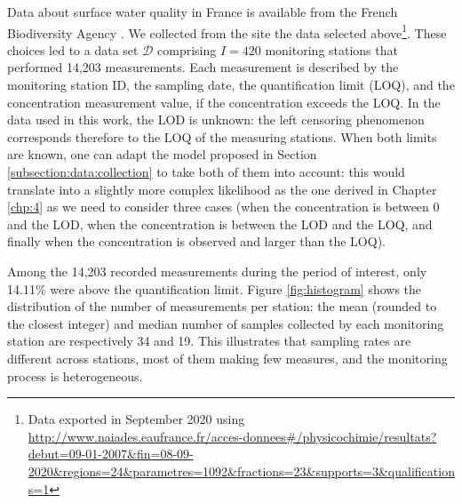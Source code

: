 Data about surface water quality in France is available from the French Biodiversity Agency \cite{Naiade}. We collected from the site the data selected above\footnote{Data exported in September 2020 using \url{http://www.naiades.eaufrance.fr/acces-donnees\#/physicochimie/resultats?debut=09-01-2007&fin=08-09-2020&regions=24&parametres=1092&fractions=23&supports=3&qualifications=1}}. 
These choices led to a data set $\mathcal D$ comprising $I = 420$ monitoring stations that performed 14,203 measurements. Each measurement is described by the monitoring station ID, the sampling date, the quantification limit (LOQ), and the concentration measurement value, if the concentration exceeds the LOQ. 
In the data used in this work, the LOD is unknown: the left censoring phenomenon corresponds therefore to the LOQ of the measuring stations. When both limits are known, one can adapt the model proposed in Section \ref{subsection:data:collection} to take both of them into account: this would translate into a slightly more complex likelihood as the one derived in Chapter \ref{chp:4} as we need to consider three cases (when the concentration is between 0 and the LOD, when the concentration is between the LOD and the LOQ, and finally when the concentration is observed and larger than the LOQ). 

Among the 14,203 recorded measurements during the period of interest, only 14.11\% were above the quantification limit. Figure \ref{fig:histogram} shows the distribution of the number of measurements per station: the mean (rounded to the closest integer) and median number of samples collected by each monitoring station are respectively 34 and 19. This illustrates that sampling rates are different across stations, most of them making few measures, and the monitoring process is heterogeneous.

